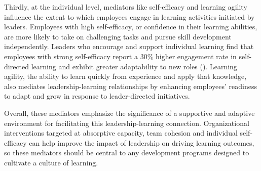 Thirdly, at the individual level, mediators like self-efficacy and learning agility influence the
extent to which employees engage in learning activities initiated by leaders. Employees with high
self-efficacy, or confidence in their learning abilities, are more likely to take on challenging
tasks and pursue skill development independently. Leaders who encourage and support individual
learning find that employees with strong self-efficacy report a 30\% higher engagement rate in
self-directed learning and exhibit greater adaptability to new roles
(\cite{OUDEGROOTEBEVERBORG201522}). Learning agility, the ability to learn quickly from experience and
apply that knowledge, also mediates leadership-learning relationships by enhancing employees'
readiness to adapt and grow in response to leader-directed initiatives.

Overall, these mediators emphasize the significance of a supportive and adaptive environment for
facilitating this leadership-learning connection. Organizational interventions targeted at
absorptive capacity, team cohesion and individual self-efficacy can help improve the impact of
leadership on driving learning outcomes, so these mediators should be central to any development
programs designed to cultivate a culture of learning.
